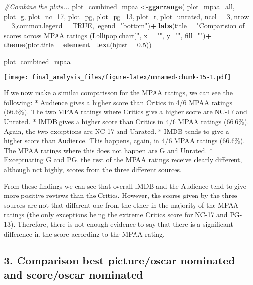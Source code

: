 \documentclass[]{article}
\newenvironment{Shaded}{\begin{snugshade}}{\end{snugshade}}
\newcommand{\CommentTok}[1]{\textcolor[rgb]{0.56,0.35,0.01}{\textit{#1}}}
\newcommand{\DataTypeTok}[1]{\textcolor[rgb]{0.13,0.29,0.53}{#1}}
\newcommand{\DecValTok}[1]{\textcolor[rgb]{0.00,0.00,0.81}{#1}}
\newcommand{\FloatTok}[1]{\textcolor[rgb]{0.00,0.00,0.81}{#1}}
\newcommand{\KeywordTok}[1]{\textcolor[rgb]{0.13,0.29,0.53}{\textbf{#1}}}
\newcommand{\NormalTok}[1]{#1}
\newcommand{\OperatorTok}[1]{\textcolor[rgb]{0.81,0.36,0.00}{\textbf{#1}}}
\newcommand{\OtherTok}[1]{\textcolor[rgb]{0.56,0.35,0.01}{#1}}
\newcommand{\StringTok}[1]{\textcolor[rgb]{0.31,0.60,0.02}{#1}}
\begin{document}
\begin{Shaded}
\begin{Highlighting}[]
\CommentTok{#Combine the plots...}
\NormalTok{plot_combined_mpaa <-}\KeywordTok{ggarrange}\NormalTok{(}
\NormalTok{  plot_mpaa_all,}
\NormalTok{  plot_g,}
\NormalTok{  plot_nc_}\DecValTok{17}\NormalTok{,}
\NormalTok{  plot_pg,}
\NormalTok{  plot_pg_}\DecValTok{13}\NormalTok{,}
\NormalTok{  plot_r,}
\NormalTok{  plot_unrated,}
  \DataTypeTok{ncol =} \DecValTok{3}\NormalTok{,}
  \DataTypeTok{nrow =} \DecValTok{3}\NormalTok{,}\DataTypeTok{common.legend =} \OtherTok{TRUE}\NormalTok{, }\DataTypeTok{legend=}\StringTok{"bottom"}\NormalTok{)}\OperatorTok{+}
\StringTok{  }\KeywordTok{labs}\NormalTok{(}\DataTypeTok{title =} \StringTok{"Comparision of scores across MPAA ratings (Lollipop chart)"}\NormalTok{, }\DataTypeTok{x =} \StringTok{""}\NormalTok{, }\DataTypeTok{y=}\StringTok{""}\NormalTok{, }\DataTypeTok{fill=}\StringTok{""}\NormalTok{)}\OperatorTok{+}
\StringTok{  }\KeywordTok{theme}\NormalTok{(}\DataTypeTok{plot.title =} \KeywordTok{element_text}\NormalTok{(}\DataTypeTok{hjust =} \FloatTok{0.5}\NormalTok{))}


\NormalTok{plot_combined_mpaa}
\end{Highlighting}
\end{Shaded}

\texttt{[image: final\_analysis\_files/figure-latex/unnamed-chunk-15-1.pdf]}

If we now make a similar comparisson for the MPAA ratings, we can see
the following: * Audience gives a higher score than Critics in 4/6 MPAA
ratings (66.6\%). The two MPAA ratings where Critics give a higher score
are NC-17 and Unrated. * IMDB gives a higher score than Critics in 4/6
MPAA ratings (66.6\%). Again, the two exceptions are NC-17 and Unrated.
* IMDB tends to give a higher score than Audience. This happens, again,
in 4/6 MPAA ratings (66.6\%). The MPAA ratings where this does not
happen are G and Unrated. * Exceptuating G and PG, the rest of the MPAA
ratings receive clearly different, although not highly, scores from the
three different sources.

From these findings we can see that overall IMDB and the Audience tend
to give more positive reviews than the Critics. However, the scores
given by the three sources are not that different one from the other in
the majority of the MPAA ratings (the only exceptions being the extreme
Critics score for NC-17 and PG-13). Therefore, there is not enough
evidence to say that there is a significant difference in the score
according to the MPAA rating.

\hypertarget{comparison-best-pictureoscar-nominated-and-scoreoscar-nominated}{%
\subsection{3. Comparison best picture/oscar nominated and score/oscar
nominated}\label{comparison-best-pictureoscar-nominated-and-scoreoscar-nominated}}
\end{document}
